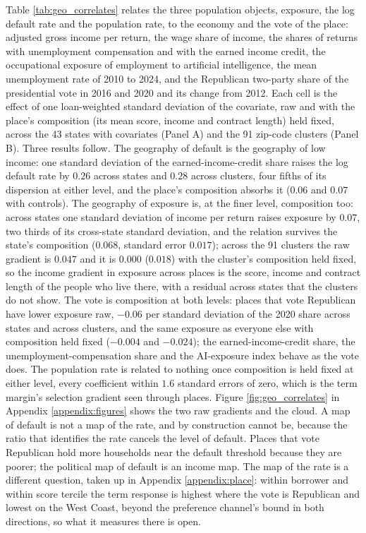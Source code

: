 Table \ref{tab:geo_correlates} relates the three population objects, exposure, the log default rate and the population rate, to the economy and the vote of the place: adjusted gross income per return, the wage share of income, the shares of returns with unemployment compensation and with the earned income credit, the occupational exposure of employment to artificial intelligence, the mean unemployment rate of 2010 to 2024, and the Republican two-party share of the presidential vote in 2016 and 2020 and its change from 2012. Each cell is the effect of one loan-weighted standard deviation of the covariate, raw and with the place's composition (its mean score, income and contract length) held fixed, across the 43 states with covariates (Panel A) and the 91 zip-code clusters (Panel B). Three results follow. The geography of default is the geography of low income: one standard deviation of the earned-income-credit share raises the log default rate by $0.26$ across states and $0.28$ across clusters, four fifths of its dispersion at either level, and the place's composition absorbs it ($0.06$ and $0.07$ with controls). The geography of exposure is, at the finer level, composition too: across states one standard deviation of income per return raises exposure by $0.07$, two thirds of its cross-state standard deviation, and the relation survives the state's composition ($0.068$, standard error $0.017$); across the 91 clusters the raw gradient is $0.047$ and it is $0.000$ ($0.018$) with the cluster's composition held fixed, so the income gradient in exposure across places is the score, income and contract length of the people who live there, with a residual across states that the clusters do not show. The vote is composition at both levels: places that vote Republican have lower exposure raw, $-0.06$ per standard deviation of the 2020 share across states and across clusters, and the same exposure as everyone else with composition held fixed ($-0.004$ and $-0.024$); the earned-income-credit share, the unemployment-compensation share and the AI-exposure index behave as the vote does. The population rate is related to nothing once composition is held fixed at either level, every coefficient within $1.6$ standard errors of zero, which is the term margin's selection gradient seen through places. Figure \ref{fig:geo_correlates} in Appendix \ref{appendix:figures} shows the two raw gradients and the cloud. A map of default is not a map of the rate, and by construction cannot be, because the ratio that identifies the rate cancels the level of default. Places that vote Republican hold more households near the default threshold because they are poorer; the political map of default is an income map. The map of the rate is a different question, taken up in Appendix \ref{appendix:place}: within borrower and within score tercile the term response is highest where the vote is Republican and lowest on the West Coast, beyond the preference channel's bound in both directions, so what it measures there is open.

